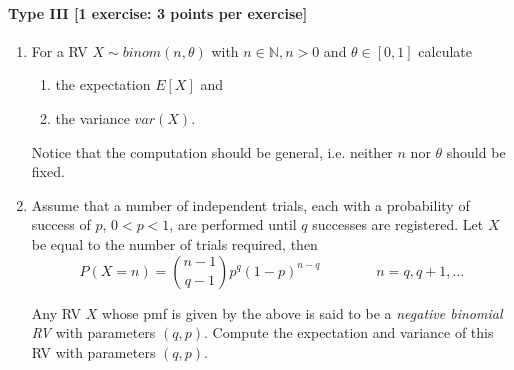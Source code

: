 \documentclass{article}
\begin{document}
	\paragraph{Type III [1 exercise: 3 points per exercise]}
\begin{enumerate}
\item For a RV $ X \sim binom(n,\theta) $ with $ n \in \mathbb{N}, n > 0 $ and $ \theta \in [0,1] $ calculate
	\begin{enumerate}
		\item the expectation $ E[X] $ and
		\item the variance $ var(X) $.
	\end{enumerate}
	Notice that the computation should be general, i.e. neither $ n $ nor $ \theta $ should be fixed.
\item Assume that a number of independent trials, each with a probability of success of $p$, $0 < p < 1$, are performed until $q$ successes are registered. Let $X$ be equal to the number of trials required, then
	$$P(X = n) = \binom{n-1}{q-1} p^{q} (1 - p)^{n-q} \qquad \qquad n = q, q+1, ...$$

	Any RV $X$ whose pmf is given by the above is said to be a {\em negative binomial RV} with parameters $(q,p)$. Compute the expectation and variance of this RV with parameters $(q,p)$.
\end{enumerate}
\end{document}
